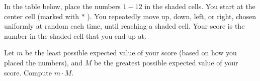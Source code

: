 In the table below, place the numbers $1-12$ in the shaded cells. You start at the center cell (marked with $*$ ). You repeatedly move up, down, left, or right, chosen uniformly at random each time, until reaching a shaded cell. Your score is the number in the shaded cell that you end up at.

Let $m$ be the least possible expected value of your score (based on how you placed the numbers), and $M$ be the greatest possible expected value of your score. Compute $m \cdot M$.

